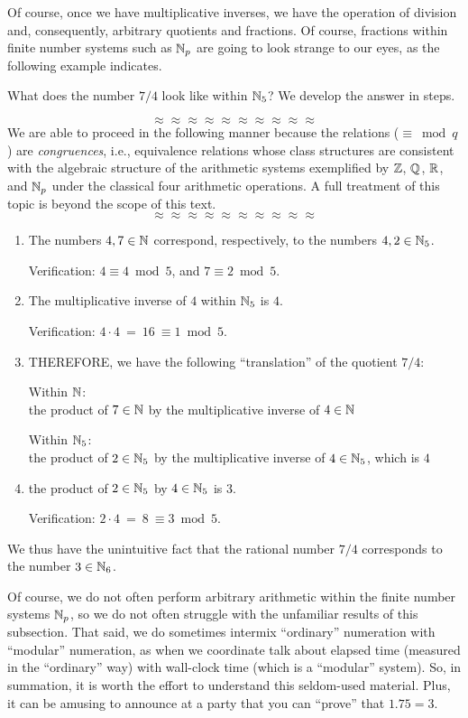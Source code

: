\medskip

Of course, once we have multiplicative inverses, we have the operation
of division and, consequently, arbitrary quotients and fractions.  Of
course, fractions within finite number systems such as $\mathbb{N}_p$ are
going to look strange to our eyes, as the following example indicates.

What does the number $7/4$ look like within $\mathbb{N}_5$?  We develop the
answer in steps.

\[ \approx \approx \approx \approx \approx \approx \approx \approx \approx \approx \]
We are able to proceed in the following manner because the relations
($\equiv \bmod q$) are {\em congruences}, 
i.e., equivalence relations whose class structures are consistent with
the algebraic structure of the arithmetic systems exemplified by $\mathbb{Z}$,
$\mathbb{Q}$, $\mathbb{R}$, and $\mathbb{N}_p$ under the classical four arithmetic operations.
A full treatment of this topic is beyond the scope of this text.
\[ \approx \approx \approx \approx \approx \approx \approx \approx \approx \approx \]
\begin{enumerate}
\item
The numbers $4, 7 \in \mathbb{N}$ correspond, respectively, to the numbers $4,
2 \in \mathbb{N}_5$.

Verification:
$4 \equiv 4 \bmod 5$, and $7 \equiv 2 \bmod 5$.

\item
The multiplicative inverse of $4$ within $\mathbb{N}_5$ is $4$.

Verification:
$4 \cdot 4 \ = \ 16 \ \equiv 1 \bmod 5$.

\item
THEREFORE, we have the following ``translation'' of the quotient $7/4$:

Within $\mathbb{N}$: \\
the product of $7 \in \mathbb{N}$ by the multiplicative inverse of $4 \in \mathbb{N}$

Within $\mathbb{N}_5$: \\
the product of $2 \in \mathbb{N}_5$ by the multiplicative inverse of $4 \in
\mathbb{N}_5$, which is $4$

\item
the product of $2 \in \mathbb{N}_5$ by $4 \in \mathbb{N}_5$ is $3$.

Verification:
$2 \cdot 4 \ = \ 8 \ \equiv 3 \bmod 5$.
\end{enumerate}
We thus have the unintuitive fact that the rational number $7/4$
corresponds to the number $3 \in \mathbb{N}_6$.

Of course, we do not often perform arbitrary arithmetic within the
finite number systems $\mathbb{N}_p$, so we do not often struggle with the
unfamiliar results of this subsection.  That said, we do sometimes
intermix ``ordinary'' numeration with ``modular'' numeration, as when
we coordinate talk about elapsed time (measured in the ``ordinary''
way) with wall-clock time (which is a ``modular'' system).  So, in
summation, it is worth the effort to understand this seldom-used
material.  Plus, it can be amusing to announce at a party that you can
``prove'' that $1.75 = 3$.


